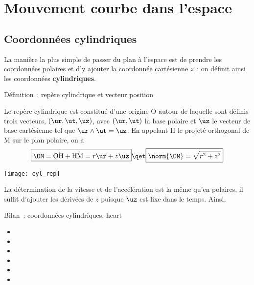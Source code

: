 \documentclass[../main/main.tex]{subfiles}
\begin{document}
\section{Mouvement courbe dans l'espace}
\subsection{Coordonnées cylindriques}

La manière la plus simple de passer du plan à l'espace est de prendre les
coordonnées polaires et d'y ajouter la coordonnée cartésienne $z$~: on définit
ainsi les coordonnées \textbf{cylindriques}.

\begin{tdefi}{Définition~: repère cylindrique et vecteur position}
	\begin{minipage}{0.70\linewidth}
		Le repère cylindrique est constitué d'une origine O autour de laquelle sont
		définis trois vecteurs, $(\ur,\ut,\uz)$, avec $(\ur,\ut)$ la base polaire et
		$\uz$ le vecteur de base cartésienne tel que $\ur \wedge \ut = \uz$. En
		appelant H le projeté orthogonal de M sur le plan polaire, on a
		\[
			\boxed{\OM = \vec{\rm OH} + \vec{\rm HM} = r\ur + z\uz}
			\qet
			\boxed{\norm{\OM} = \sqrt{r^2 + z^2}}
		\]
	\end{minipage}
	\hfill
	\begin{minipage}{0.25\linewidth}
		\begin{center}
			\texttt{[image: cyl\_rep]}
		\end{center}
	\end{minipage}
\end{tdefi}

La détermination de la vitesse et de l'accélération est la même qu'en polaires,
il suffit d'ajouter les dérivées de $z$ puisque $\uz$ est fixe dans le temps.
Ainsi,

\begin{tror}{Bilan~: coordonnées cylindriques, heart}
	\begin{itemize}
		\item {}
		\item {}
		\item {}
		\item {}
		\item {}
		\item {}
	\end{itemize}
\end{tror}
\end{document}
